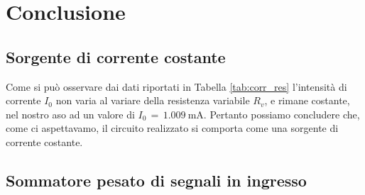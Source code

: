 \section*{Conclusione}

\subsection*{Sorgente di corrente costante}

Come si può osservare dai dati riportati in Tabella \ref{tab:corr_res} l'intensità di corrente $I_0$ non varia al variare della resistenza variabile $R_v$, e rimane costante, nel nostro aso ad un valore di $I_0\,=\,\SI{1.009}{\milli\ampere}$. Pertanto possiamo concludere che, come ci aspettavamo, il circuito realizzato si comporta come una sorgente di corrente costante.

\subsection*{Sommatore pesato di segnali in ingresso}

